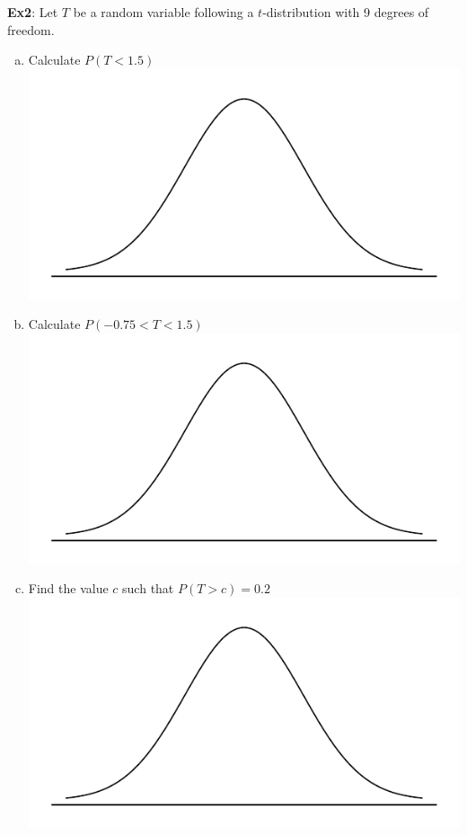\documentclass[fleqn, 12pt]{article}\usepackage[]{graphicx}\usepackage[]{color}
\begin{document}
\textbf{Ex2}:  Let $T$ be a random variable following a $t$-distribution with 9 degrees of freedom.
\begin{enumerate}[(a)]
\item Calculate $P(T < 1.5)$\\
\includegraphics[scale=0.55]{norm_draw.pdf}
\vspace{1cm}



\item Calculate $P(-0.75 < T < 1.5)$\\
\includegraphics[scale=0.6]{norm_draw.pdf}
\vspace{1cm}



\item Find the value $c$ such that $P(T > c) = 0.2$\\
\includegraphics[scale=0.6]{norm_draw.pdf}
\vspace{1cm}


\end{enumerate}
\clearpage
\end{document}
